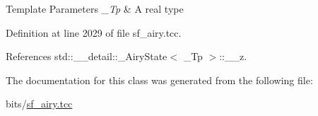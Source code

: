 \begin{DoxyTemplParams}{Template Parameters}
{\em \+\_\+\+Tp} & A real type \\
\hline
\end{DoxyTemplParams}


Definition at line 2029 of file sf\+\_\+airy.\+tcc.



References std\+::\+\_\+\+\_\+detail\+::\+\_\+\+Airy\+State$<$ \+\_\+\+Tp $>$\+::\+\_\+\+\_\+z.



The documentation for this class was generated from the following file\+:\begin{DoxyCompactItemize}
\item 
bits/\hyperlink{sf__airy_8tcc}{sf\+\_\+airy.\+tcc}\end{DoxyCompactItemize}
